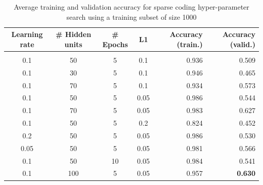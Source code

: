 \documentclass{article} %
\begin{document}
\begin{table}[h]
\caption{Average training and validation accuracy for sparse coding hyper-parameter
 search using a training subset of size 1000}
\label{results-table}
\begin{center}
\begin{adjustbox}{width=1\textwidth}
\begin{tabular}{cccc|rr}

\multicolumn{1}{c}{\bf Learning rate}  
&\multicolumn{1}{c}{\bf \# Hidden units}  
&\multicolumn{1}{c}{\bf \# Epochs} 
&\multicolumn{1}{c}{\bf L1} 
&\multicolumn{1}{|r}{\bf Accuracy (train.)}
&\multicolumn{1}{r}{\bf Accuracy (valid.)}
\\ \hline \\	
0.1 & 50 & 5 & 0.1 & 0.936 & 0.509 \\
0.1 & 30 & 5 & 0.1 & 0.946 & 0.465 \\
0.1 & 70 & 5 & 0.1 & 0.934 & 0.573 \\
0.1 & 50 & 5 & 0.05 & 0.986 & 0.544 \\
0.1 & 70 & 5 & 0.05 & 0.983 & 0.627 \\
0.1 & 50 & 5 & 0.2 & 0.824 & 0.452 \\
0.2 & 50 & 5 & 0.05 & 0.986 & 0.530 \\
0.05 & 50 & 5 & 0.05 & 0.981 & 0.566 \\
0.1 & 50 & 10 & 0.05 & 0.984 & 0.541 \\
0.1 & 100 & 5 & 0.05 & 0.957 & \textbf{0.630} \\

\end{tabular}
\end{adjustbox}
\end{center}
\end{table}
\end{document}
